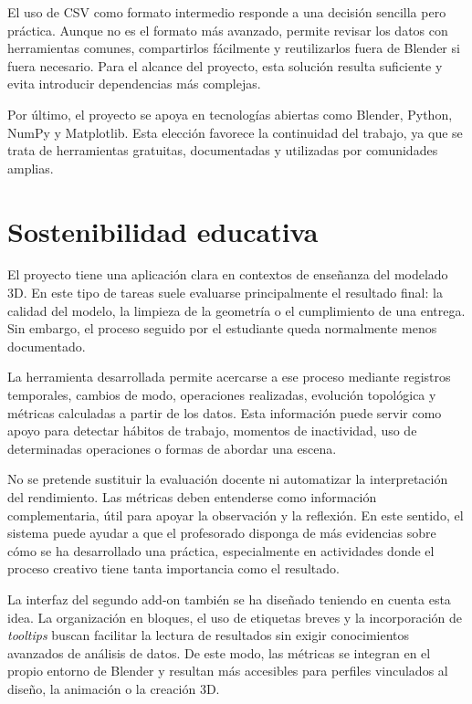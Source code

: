 El uso de CSV como formato intermedio responde a una decisión sencilla pero práctica. Aunque no es el formato más avanzado, permite revisar los datos con herramientas comunes, compartirlos fácilmente y reutilizarlos fuera de Blender si fuera necesario. Para el alcance del proyecto, esta solución resulta suficiente y evita introducir dependencias más complejas.

Por último, el proyecto se apoya en tecnologías abiertas como Blender, Python, NumPy y Matplotlib. Esta elección favorece la continuidad del trabajo, ya que se trata de herramientas gratuitas, documentadas y utilizadas por comunidades amplias.

\section{Sostenibilidad educativa}

El proyecto tiene una aplicación clara en contextos de enseñanza del modelado 3D. En este tipo de tareas suele evaluarse principalmente el resultado final: la calidad del modelo, la limpieza de la geometría o el cumplimiento de una entrega. Sin embargo, el proceso seguido por el estudiante queda normalmente menos documentado.

La herramienta desarrollada permite acercarse a ese proceso mediante registros temporales, cambios de modo, operaciones realizadas, evolución topológica y métricas calculadas a partir de los datos. Esta información puede servir como apoyo para detectar hábitos de trabajo, momentos de inactividad, uso de determinadas operaciones o formas de abordar una escena.

No se pretende sustituir la evaluación docente ni automatizar la interpretación del rendimiento. Las métricas deben entenderse como información complementaria, útil para apoyar la observación y la reflexión. En este sentido, el sistema puede ayudar a que el profesorado disponga de más evidencias sobre cómo se ha desarrollado una práctica, especialmente en actividades donde el proceso creativo tiene tanta importancia como el resultado.

La interfaz del segundo add-on también se ha diseñado teniendo en cuenta esta idea. La organización en bloques, el uso de etiquetas breves y la incorporación de \textit{tooltips} buscan facilitar la lectura de resultados sin exigir conocimientos avanzados de análisis de datos. De este modo, las métricas se integran en el propio entorno de Blender y resultan más accesibles para perfiles vinculados al diseño, la animación o la creación 3D.

